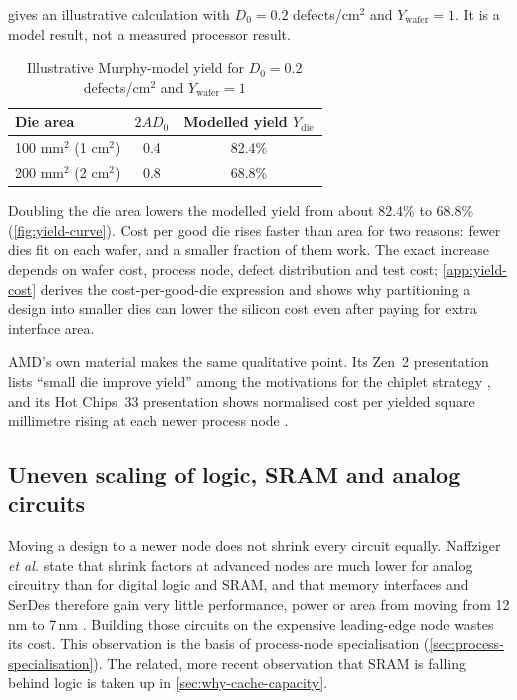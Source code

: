  gives an illustrative calculation with $D_0 = 0.2$ defects/cm$^2$ and $Y_{\mathrm{wafer}} = 1$. It is a model result, not a measured processor result.

\begin{table}[htbp]
  \centering
  \caption{Illustrative Murphy-model yield for $D_0 = 0.2$ defects/cm$^2$ and $Y_{\mathrm{wafer}} = 1$}
  \label{tab:yield-example}
  \begin{tabular}{@{}lcc@{}}
    \toprule
    \textbf{Die area} & \textbf{$2 A D_0$} & \textbf{Modelled yield $Y_{\mathrm{die}}$} \\
    \midrule
    100 mm$^2$ (1 cm$^2$) & 0.4 & 82.4\% \\
    200 mm$^2$ (2 cm$^2$) & 0.8 & 68.8\% \\
    \bottomrule
  \end{tabular}
\end{table}

Doubling the die area lowers the modelled yield from about 82.4\% to 68.8\% (\cref{fig:yield-curve}). Cost per good die rises faster than area for two reasons: fewer dies fit on each wafer, and a smaller fraction of them work. The exact increase depends on wafer cost, process node, defect distribution and test cost; \cref{app:yield-cost} derives the cost-per-good-die expression and shows why partitioning a design into smaller dies can lower the silicon cost even after paying for extra interface area.



AMD's own material makes the same qualitative point. Its Zen~2 presentation lists ``small die improve yield'' among the motivations for the chiplet strategy \cite{suggs2019zen2}, and its Hot Chips~33 presentation shows normalised cost per yielded square millimetre rising at each newer process node \cite{swaminathanAdvancedPackagingEnabling2021}.

\subsection{Uneven scaling of logic, SRAM and analog circuits}
\label{sec:uneven-scaling}
Moving a design to a newer node does not shrink every circuit equally. Naffziger \emph{et al.} state that shrink factors at advanced nodes are much lower for analog circuitry than for digital logic and SRAM, and that memory interfaces and SerDes therefore gain very little performance, power or area from moving from 12\,nm to 7\,nm \cite{naffziger2020chiplet}. Building those circuits on the expensive leading-edge node wastes its cost. This observation is the basis of process-node specialisation (\cref{sec:process-specialisation}). The related, more recent observation that SRAM is falling behind logic is taken up in \cref{sec:why-cache-capacity}.

